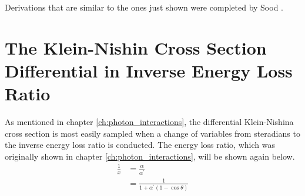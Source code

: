 Derivations that are similar to the ones just shown were completed by Sood
\citep{sood_doppler_2004}. 

\section{The Klein-Nishin Cross Section Differential in Inverse Energy Loss Ratio}
\label{diff_kn_cross_sec_var_change}
As mentioned in chapter \ref{ch:photon_interactions}, the differential 
Klein-Nishina cross section is most easily sampled when a change of variables
from steradians to the inverse energy loss ratio is conducted. The energy loss
ratio, which was originally shown in chapter \ref{ch:photon_interactions}, will
be shown again below.
\begin{align}
  \frac{1}{x} & = \frac{\alpha}{\alpha^{'}} \nonumber \\
  & = \frac{1}{1+\alpha^{'}(1-\cos{\theta})} \nonumber
\end{align}

